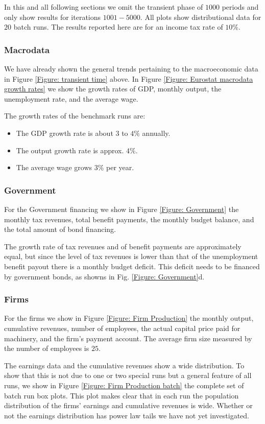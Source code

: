 In this and all following sections we omit the transient phase of $1000$ periods and only show results for iterations $1001-5000$.
All plots show distributional data for $20$ batch runs. The results reported here are for an income tax rate of $10\%$.

\subsubsection*{Macrodata}
We have already shown the general trends pertaining to the macroeconomic data in Figure \ref{Figure: transient time} above. 
In Figure \ref{Figure: Eurostat macrodata growth rates} we show the growth rates of GDP, monthly output, the unemployment rate, and the average wage.

The growth rates of the benchmark runs are:
\begin{itemize}
\item The GDP growth rate is about $3$ to $4\%$ annually.
\item The output growth rate is approx. $4\%$.
\item The average wage grows $3\%$ per year.
\end{itemize}

\subsubsection*{Government}
For the Government financing we show in Figure \ref{Figure: Government} the monthly tax revenues, total benefit payments, the monthly budget balance,
and the total amount of bond financing.

The growth rate of tax revenues and of benefit payments are approximately equal, but
since the level of tax revenues is lower than that of the unemployment benefit payout there is a monthly budget deficit.
This deficit needs to be financed by government bonds, as showns in Fig. \ref{Figure: Government}d.

\subsubsection*{Firms}
For the firms we show in Figure \ref{Figure: Firm Production} the monthly output, cumulative revenues, number of employees, the actual capital price paid for machinery, and the firm's payment account. The average firm size measured by the number of employees is $25$.

The earnings data and the cumulative revenues show a wide distribution. To show that this is not due to one or two special runs but a general feature of all runs, we  show in Figure \ref{Figure: Firm Production batch} the complete set of batch run box plots. This plot makes clear that in each run the population distribution of the firms' earnings and cumulative revenues is wide.
Whether or not the earnings distribution has power law tails we have not yet investigated.

